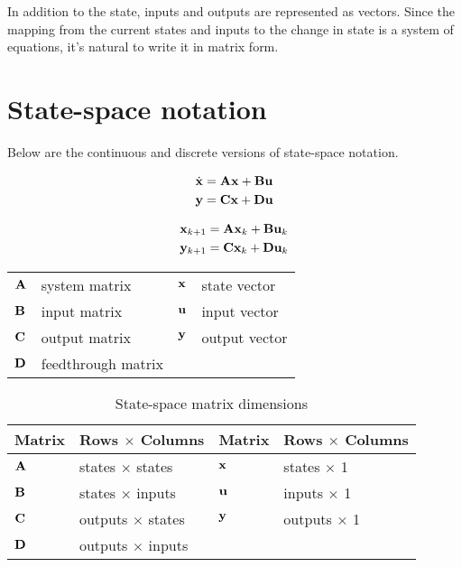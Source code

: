 In addition to the \gls{state}, inputs and outputs are represented as vectors.
Since the mapping from the current states and inputs to the change in state is a
system of equations, it's natural to write it in matrix form.

\section{State-space notation}

Below are the continuous and discrete versions of state-space notation.

\begin{align}
  \dot{\mathbf{x}} &= \mathbf{A}\mathbf{x} + \mathbf{B}\mathbf{u} \label{eq:ss_ctrl_x} \\
  \mathbf{y} &= \mathbf{C}\mathbf{x} + \mathbf{D}\mathbf{u} \label{eq:ss_ctrl_y}
\end{align}

\begin{align}
  \mathbf{x}_{k+1} &= \mathbf{A}\mathbf{x}_k + \mathbf{B}\mathbf{u}_k \label{eq:ssz_ctrl_x} \\
  \mathbf{y}_{k+1} &= \mathbf{C}\mathbf{x}_k + \mathbf{D}\mathbf{u}_k \label{eq:ssz_ctrl_y}
\end{align}

\begin{center}
  \renewcommand{\arraystretch}{1.3}
  \begin{tabulary}{\linewidth}{LLLL}
    $\mathbf{A}$ & system matrix      & $\mathbf{x}$ & state vector \\
    $\mathbf{B}$ & input matrix       & $\mathbf{u}$ & input vector \\
    $\mathbf{C}$ & output matrix      & $\mathbf{y}$ & output vector \\
    $\mathbf{D}$ & feedthrough matrix &  &  \\
  \end{tabulary}
\end{center}

\begin{table}[h]
  \renewcommand{\arraystretch}{1.5}
  \centering
  \begin{tabular}{|ll|ll|}
    \hline
    \rowcolor{headingbg}
    \textbf{Matrix} & \textbf{Rows $\times$ Columns} &
    \textbf{Matrix} & \textbf{Rows $\times$ Columns} \\
    \hline
    $\mathbf{A}$ & states $\times$ states & $\mathbf{x}$ & states $\times$ 1 \\
    $\mathbf{B}$ & states $\times$ inputs & $\mathbf{u}$ & inputs $\times$ 1 \\
    $\mathbf{C}$ & outputs $\times$ states & $\mathbf{y}$ & outputs $\times$ 1 \\
    $\mathbf{D}$ & outputs $\times$ inputs &  &  \\
    \hline
  \end{tabular}
  \caption{State-space matrix dimensions}
  \label{tab:ss_matrix_dims}
\end{table}


